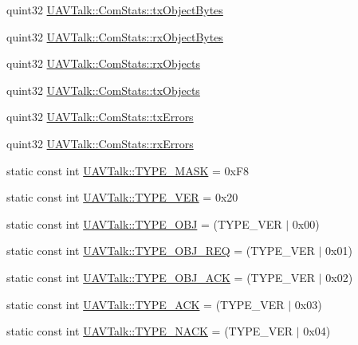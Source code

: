 \begin{DoxyCompactItemize}
quint32 \hyperlink{group___u_a_v_talk_plugin_gaf811665cd1c815ac65764deff354ba6c}{\-U\-A\-V\-Talk\-::\-Com\-Stats\-::tx\-Object\-Bytes}
\item 
quint32 \hyperlink{group___u_a_v_talk_plugin_ga6a61f515e2c09de8fadddb1d8382a2a1}{\-U\-A\-V\-Talk\-::\-Com\-Stats\-::rx\-Object\-Bytes}
\item 
quint32 \hyperlink{group___u_a_v_talk_plugin_ga60c07de32f4130a7b761066819bf0712}{\-U\-A\-V\-Talk\-::\-Com\-Stats\-::rx\-Objects}
\item 
quint32 \hyperlink{group___u_a_v_talk_plugin_ga4d48878de025a87f65263e537467fb9b}{\-U\-A\-V\-Talk\-::\-Com\-Stats\-::tx\-Objects}
\item 
quint32 \hyperlink{group___u_a_v_talk_plugin_gaddc2324ebd5b83b73e1f873131efcccf}{\-U\-A\-V\-Talk\-::\-Com\-Stats\-::tx\-Errors}
\item 
quint32 \hyperlink{group___u_a_v_talk_plugin_ga52c1d5163810f507e6ca052884ee7ecc}{\-U\-A\-V\-Talk\-::\-Com\-Stats\-::rx\-Errors}
\item 
static const int \hyperlink{group___u_a_v_talk_plugin_gadad9ea7937a0ef8cf1a162fc2265e9c4}{\-U\-A\-V\-Talk\-::\-T\-Y\-P\-E\-\_\-\-M\-A\-S\-K} = 0x\-F8
\item 
static const int \hyperlink{group___u_a_v_talk_plugin_gad838c235ec5ef5e1389791d518faa6e7}{\-U\-A\-V\-Talk\-::\-T\-Y\-P\-E\-\_\-\-V\-E\-R} = 0x20
\item 
static const int \hyperlink{group___u_a_v_talk_plugin_ga160fa827bdb9b5114b132cf644f76d4c}{\-U\-A\-V\-Talk\-::\-T\-Y\-P\-E\-\_\-\-O\-B\-J} = (\-T\-Y\-P\-E\-\_\-\-V\-E\-R $|$ 0x00)
\item 
static const int \hyperlink{group___u_a_v_talk_plugin_ga5e1cb8e2b0aa00f08a16af9c858079e9}{\-U\-A\-V\-Talk\-::\-T\-Y\-P\-E\-\_\-\-O\-B\-J\-\_\-\-R\-E\-Q} = (\-T\-Y\-P\-E\-\_\-\-V\-E\-R $|$ 0x01)
\item 
static const int \hyperlink{group___u_a_v_talk_plugin_gafc2b2ad8c68063a80d64666d0e812572}{\-U\-A\-V\-Talk\-::\-T\-Y\-P\-E\-\_\-\-O\-B\-J\-\_\-\-A\-C\-K} = (\-T\-Y\-P\-E\-\_\-\-V\-E\-R $|$ 0x02)
\item 
static const int \hyperlink{group___u_a_v_talk_plugin_gaec2c5c58b05deb71a40e1248ff82aa52}{\-U\-A\-V\-Talk\-::\-T\-Y\-P\-E\-\_\-\-A\-C\-K} = (\-T\-Y\-P\-E\-\_\-\-V\-E\-R $|$ 0x03)
\item 
static const int \hyperlink{group___u_a_v_talk_plugin_ga809ec3528886e43e38072e2d16787668}{\-U\-A\-V\-Talk\-::\-T\-Y\-P\-E\-\_\-\-N\-A\-C\-K} = (\-T\-Y\-P\-E\-\_\-\-V\-E\-R $|$ 0x04)
\item 

\end{DoxyCompactItemize}
